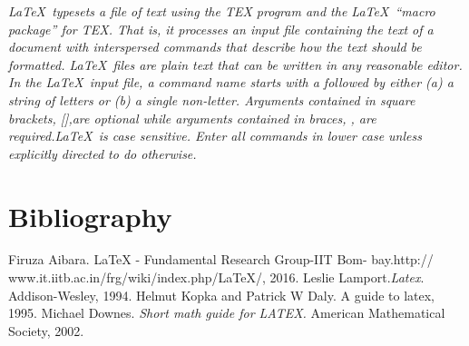 \documentclass{article}
\begin{document}
        \begin{minipage}{0.55\linewidth}
        \begin{mdframed}
        {\emph{\LaTeX\  typesets a file of text using the TEX program and the \LaTeX\  “macro package” for TEX. That is, it processes an input file containing the text of a document with interspersed commands that describe how the text should be formatted. \LaTeX\  files are plain text that can be written in any reasonable editor. In the \LaTeX\  input file, a command name starts with a followed by either (a) a string of letters or (b) a single non-letter. Arguments contained in square brackets, [],are optional while arguments contained in braces, {}, are required.\LaTeX\  is case sensitive. Enter all commands in lower case unless explicitly directed to do otherwise.}}
        
        \end{mdframed}
        \end{minipage}
        
        \newpage
        \section{Bibliography}

    \begin{thebibliography}{}  Firuza Aibara. LaTeX - Fundamental Research Group-IIT Bom- bay.http:// www.it.iitb.ac.in/frg/wiki/index.php/LaTeX/, 2016.
         Leslie Lamport.{\it Latex}. Addison-Wesley, 1994.
         Helmut Kopka and Patrick W Daly. A guide to latex, 1995.
         Michael Downes. {\it Short math guide for LATEX.} American Mathematical Society, 2002.
    \end{thebibliography}
\end{document}
